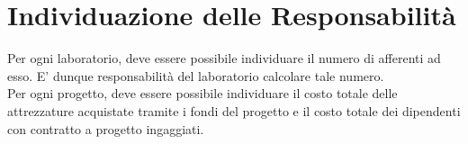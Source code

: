     \section{Individuazione delle Responsabilità}
        Per ogni laboratorio, deve essere possibile individuare il numero di afferenti ad esso. E' dunque responsabilità del laboratorio calcolare tale numero.\\
        Per ogni progetto, deve essere possibile individuare il costo totale delle attrezzature acquistate tramite i fondi del progetto e il costo totale dei dipendenti con contratto a progetto ingaggiati.